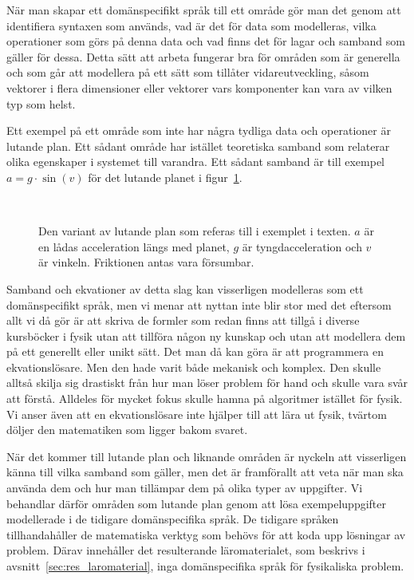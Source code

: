 När man skapar ett domänspecifikt språk till ett område gör man det genom att
identifiera syntaxen som används, vad är det för data som modelleras,
vilka operationer som görs på denna data och vad finns det för lagar och samband
som gäller för dessa. Detta sätt att arbeta fungerar bra för områden som är
generella och som går att modellera på ett sätt som tillåter vidareutveckling, såsom
vektorer i flera dimensioner eller vektorer vars komponenter kan vara av vilken
typ som helst.

Ett exempel på ett område som inte har några tydliga data och operationer är 
lutande plan. Ett sådant område har istället teoretiska samband som relaterar
olika egenskaper i systemet till varandra. Ett sådant samband är till exempel $a
= g \cdot \sin(v)$ för det lutande planet i figur~\ref{fig:lutande_plan}.

\begin{figure}[tph]
  \centering
  \caption{Den variant av lutande plan som referas till i exemplet i texten. $a$
  är en lådas acceleration längs med planet, $g$ är tyngdacceleration och $v$ är
  vinkeln. Friktionen antas vara försumbar.}~\label{fig:lutande_plan}
\end{figure}

Samband och ekvationer av detta slag kan visserligen modelleras som ett domänspecifikt
språk, men vi menar att nyttan inte blir stor med det eftersom allt vi då gör är
att skriva de formler som redan finns att tillgå i diverse kursböcker i fysik
utan att tillföra någon ny kunskap och utan att modellera dem på ett generellt
eller unikt sätt. Det man då kan göra är att programmera en ekvationslösare. Men
den hade varit både mekanisk och komplex. Den skulle alltså skilja sig
drastiskt från hur man löser problem för hand och skulle vara svår att förstå.
Alldeles för mycket fokus skulle hamna på algoritmer istället för fysik. Vi
anser även att en ekvationslösare inte hjälper till att lära ut fysik, tvärtom
döljer den matematiken som ligger bakom svaret.

När det kommer till lutande plan och liknande områden är nyckeln att visserligen
känna till vilka samband som gäller, men det är framförallt att veta när man ska
använda dem och hur man tillämpar dem på olika typer av uppgifter. Vi behandlar
därför områden som lutande plan genom att lösa exempeluppgifter modellerade i de
tidigare domänspecifika språk. De tidigare språken tillhandahåller de matematiska
verktyg som behövs för att koda upp lösningar av problem. Därav innehåller det
resulterande läromaterialet, som beskrivs i avsnitt~\ref{sec:res_laromaterial},
inga domänspecifika språk för fysikaliska problem.

